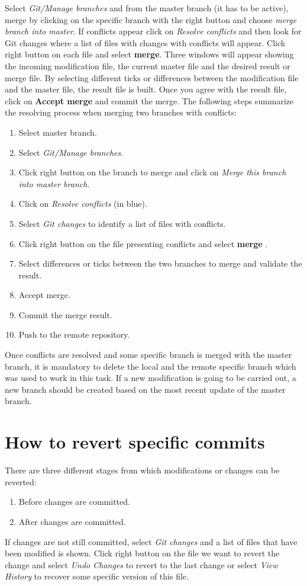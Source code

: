  Select \textit{Git/Manage branches} and from the master branch (it has to be active),  merge  
 by clicking on the specific branch with the right button and choose
 \textit{merge branch into master}.
 If conflicts appear click on \textit{Resolve conflicts} and then look for Git changes 
 where a list of files with changes with conflicts will appear.
 Click right button on each file and select {\bf merge}. Three windows will appear showing 
 the incoming modification file, the current master file and the desired result or merge file. 
 By selecting different ticks or differences between 
 the modification file and the master file, the result file is built. 
 Once you agree with the result file, click on {\bf Accept merge} and commit the merge. 
 The following steps  summarize the resolving process when merging two branches with conflicts:
 \begin{enumerate} 
 \setlength\itemsep{0.0cm}
 \item Select master branch. 
 \item Select \textit{Git/Manage branches}. 
 \item Click right button on the branch to merge and click on \textit{Merge this branch 
 into master branch}. 
 \item Click on \textit{Resolve conflicts} (in blue).
 \item Select \textit{Git changes} to identify a list of files with conflicts. 
 \item Click right button on the file presenting conflicts and select {\bf merge }.
 \item Select differences or ticks between the two branches to merge and validate the result. 
 \item Accept merge. 
 \item Commit the merge result. 
 \item Push to the remote repository. 
 \end{enumerate}

Once conflicts are resolved and some specific branch is merged with the master branch, 
it is mandatory  to delete the local and the remote specific branch which was used to work in this task. 
If a new modification is going to be carried out, 
a new branch should be created based on the most recent update of the master branch. 

\section{How to revert specific commits} 
There are three different stages from which modifications or changes  can be reverted: 
\begin{enumerate}
 \setlength\itemsep{0.0cm}
\item Before changes are committed. 
\item After changes are committed.
\end{enumerate}
If changes are not still committed, select \textit{Git changes} and a list of files that 
have been modified is shown. 
Click right button on the file we want to revert the change and select \textit{Undo Changes}
to revert to the last change or select \textit{View History} to recover some 
specific version of this file.  


